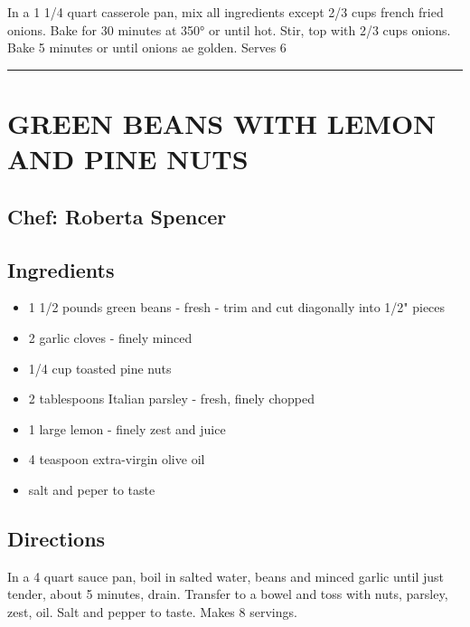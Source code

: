 \documentclass[
]{book}
\providecommand{\tightlist}{%
  \setlength{\itemsep}{0pt}\setlength{\parskip}{0pt}}
\begin{document}
In a 1 1/4 quart casserole pan, mix all ingredients except 2/3 cups french fried onions. Bake for 30 minutes at 350° or until hot. Stir, top with 2/3 cups onions. Bake 5 minutes or until onions ae golden. Serves 6

\begin{center}\rule{0.5\linewidth}{0.5pt}\end{center}

\hypertarget{green-beans-with-lemon-and-pine-nuts}{%
\section*{GREEN BEANS WITH LEMON AND PINE NUTS}\label{green-beans-with-lemon-and-pine-nuts}}


\hypertarget{chef-roberta-spencer-7}{%
\subsection*{Chef: Roberta Spencer}\label{chef-roberta-spencer-7}}


\hypertarget{ingredients-32}{%
\subsection*{Ingredients}\label{ingredients-32}}


\begin{itemize}
\tightlist
\item
  1 1/2 pounds green beans - fresh - trim and cut diagonally into 1/2" pieces
\item
  2 garlic cloves - finely minced
\item
  1/4 cup toasted pine nuts
\item
  2 tablespoons Italian parsley - fresh, finely chopped
\item
  1 large lemon - finely zest and juice
\item
  4 teaspoon extra-virgin olive oil
\item
  salt and peper to taste
\end{itemize}

\hypertarget{directions-32}{%
\subsection*{Directions}\label{directions-32}}


In a 4 quart sauce pan, boil in salted water, beans and minced garlic until just tender, about 5 minutes, drain. Transfer to a bowel and toss with nuts, parsley, zest, oil. Salt and pepper to taste. Makes 8 servings.
\end{document}
